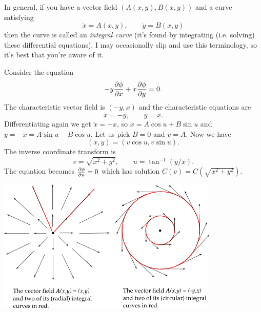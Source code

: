 \begin{rmk}
In general, if you have a vector field $(A(x,y),B(x,y))$ and a curve satisfying
\[\dot{x}=A(x,y),\qquad \dot{y}=B(x,y)\]
then the curve is called an {\em integral curve} (it's found by integrating (i.e. solving) these differential equations). I may occasionally slip and use this terminology, so it's best that you're aware of it.
\end{rmk}

\begin{exm}
Consider the equation
\[-y\frac{\partial \phi}{\partial x}+x\frac{\partial \phi}{\partial y}=0.\]
The characteristic vector field is $(-y,x)$ and the characteristic equations are
\[\dot{x}=-y,\qquad\dot{y}=x.\]
Differentiating again we get $\ddot{x}=-x$, so $x=A\cos u+B\sin u$ and $y=-\dot{x}=A\sin u-B\cos u$. Let us pick $B=0$ and $v=A$. Now we have
\[(x,y)=(v\cos u,v\sin u).\]
The inverse coordinate transform is
\[v=\sqrt{x^2+y^2},\qquad u=\tan^{-1}(y/x).\]
The equation becomes $\frac{\partial \phi}{\partial u}=0$ which has solution $C(v)=C(\sqrt{x^2+y^2})$.
\end{exm}

{
\begin{center}
\includegraphics[width=400px]{integral-curves.png}
\end{center}
}

